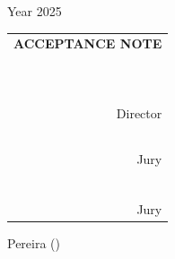 \newpage
\begin{center}
	Year 2025
\end{center}
\begin{flushright}
	\begin{tabular}{r}
		\multicolumn{1}{c}{\textbf{ACCEPTANCE NOTE}} \\
		\\
		\textbf{} \bigstrut[b]                       \\
		\hline
		\textbf{} \bigstrut                          \\
		\hline
		\textbf{} \bigstrut                          \\
		\hline
		\bigstrut[t]                                 \\
		\\
		\\
		\\
		\\
		\textbf{} \bigstrut[b]                       \\
		\hline
		Director \bigstrut[t]                        \\
		\\
		\\
		\\
		\\
		\textbf{} \bigstrut[b]                       \\
		\hline
		Jury \bigstrut[t]                            \\
		\\
		\\
		\\
		\\
		\\
		\textbf{} \bigstrut[b]                       \\
		\hline
		Jury \bigstrut[t]                            \\
	\end{tabular}%

\end{flushright}
\vspace{96pt}
\begin{center}
	Pereira (\Date)
\end{center}
